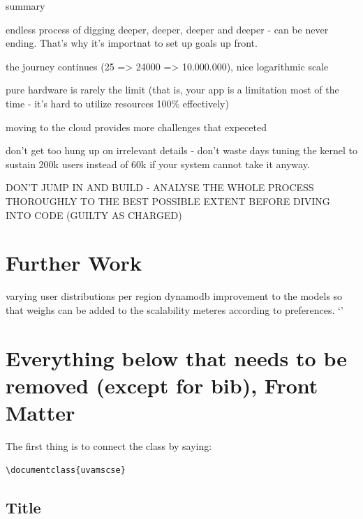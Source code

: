 \documentclass{uvamscse}
\begin{document}
summary

endless process of digging deeper, deeper, deeper and deeper - can be never ending. That's why it's importnat to set up goals up front.

the journey continues (25 => 24000 => 10.000.000), nice logarithmic scale

pure hardware is rarely the limit (that is, your app is a limitation most of the time - it's hard to utilize resources 100\% effectively)

moving to the cloud provides more challenges that expeceted

don't get too hung up on irrelevant details - don't waste days tuning the kernel to sustain 200k users instead of 60k if your system cannot take it anyway.

DON'T JUMP IN AND BUILD - ANALYSE THE WHOLE PROCESS THOROUGHLY TO THE BEST POSSIBLE EXTENT BEFORE DIVING INTO CODE (GUILTY AS CHARGED)

\chapter{Further Work}\label{Further Work}
varying user distributions per region
dynamodb
improvement to the models so that weighs can be added to the scalability meteres according to preferences.
`'
\chapter{Everything below that needs to be removed (except for bib), Front Matter}

The first thing is to connect the class by saying:

\begin{snippet}
\begin{verbatim}
\documentclass{uvamscse}
\end{verbatim}
\end{snippet}

\section{Title}
\end{document}

